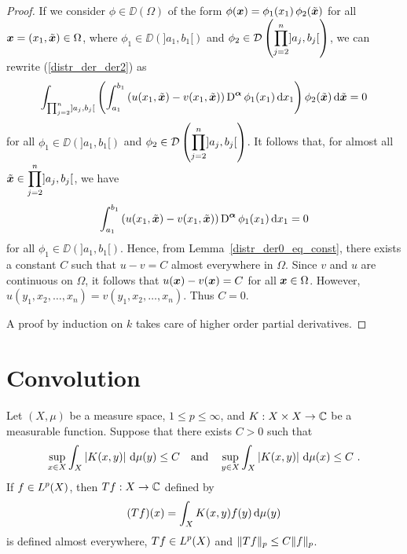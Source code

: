 \begin{proof}
If we consider $\phi \in \DD(\Omega)$ of the form
$\displaystyle \phi({\bm{x}}) = \phi_1(x_1) \, \phi_2(\tilde{{\bm{x}}})$ for all
${\bm{x}} = (x_1,\tilde{{\bm{x}}}) \in \Omega$, where
$\phi_1 \in \DD(]a_1,b_1[)$ and
$\displaystyle \phi_2 \in \mathcal{D}\left(\prod_{j=2}^n]a_j,b_j[\right)$, we
can rewrite (\ref{distr_der_der2}) as
\[
\int_{\prod_{j=2}^n]a_j,b_j[} \left( \int_{a_1}^{b_1}
\left(u(x_1,\tilde{{\bm{x}}}) - v(x_1,\tilde{{\bm{x}}})\right)
\operatorname{D}^{{\bm{\alpha}}} \phi_1(x_1) \,\mathrm{d}{x_1} \right) \phi_2(\tilde{{\bm{x}}})
\,\mathrm{d}{\tilde{{\bm{x}}}} = 0
\]
for all $\phi_1 \in \DD(]a_1,b_1[)$ and
$\displaystyle \phi_2 \in \mathcal{D}\left(\prod_{j=2}^n]a_j,b_j[\right)$.
It follows that, for almost all
$\displaystyle \tilde{{\bm{x}}} \in \prod_{j=2}^n]a_j,b_j[$, we have
\[
\int_{a_1}^{b_1}
\left(u(x_1,\tilde{{\bm{x}}}) - v(x_1,\tilde{{\bm{x}}})\right) \operatorname{D}^{{\bm{\alpha}}}
\phi_1(x_1) \,\mathrm{d}{x_1} = 0
\]
for all $\phi_1 \in \DD(]a_1,b_1[)$.
Hence, from Lemma~\ref{distr_der0_eq_const}, there exists a constant $C$ such
that $u-v = C$ almost everywhere in $\Omega$.  Since $v$ and $u$ are
continuous on $\Omega$, it follows that
$u({\bm{x}})-v({\bm{x}}) = C$ for all ${\bm{x}} \in \Omega$.
However, $u(y_1,x_2,\ldots,x_n) = v(y_1,x_2, \ldots,x_n)$.  Thus
$C=0$.

 A proof by induction on $k$ takes care of
higher order partial derivatives.
\end{proof}

\section{Convolution} \label{sectConvolution}

\begin{theorem} \label{distr_GyoungI}
Let $\left(X,\mu\right)$ be a measure space,
$1\leq p \leq \infty$, and $K:X\times X \rightarrow \mathbb{C}$ be a
measurable function.  Suppose that there exists $C>0$ such that
\[
\sup_{x\in X} \int_X \left|K(x,y)\right| \,\mathrm{d}{\mu(y)} \leq C
\quad \text{and} \quad
\sup_{y\in X} \int_X \left|K(x,y)\right| \,\mathrm{d}{\mu(x)} \leq C \ .
\]
If $\displaystyle f \in L^p(X)$, then $Tf:X\rightarrow \mathbb{C}$ defined by
\[
(Tf)(x) = \int_X K(x,y)f(y) \,\mathrm{d}{\mu(y)}
\]
is defined almost everywhere, $\displaystyle Tf \in L^p(X)$ and
$\displaystyle \| Tf \|_p \leq C \|f\|_p$.
\end{theorem}

